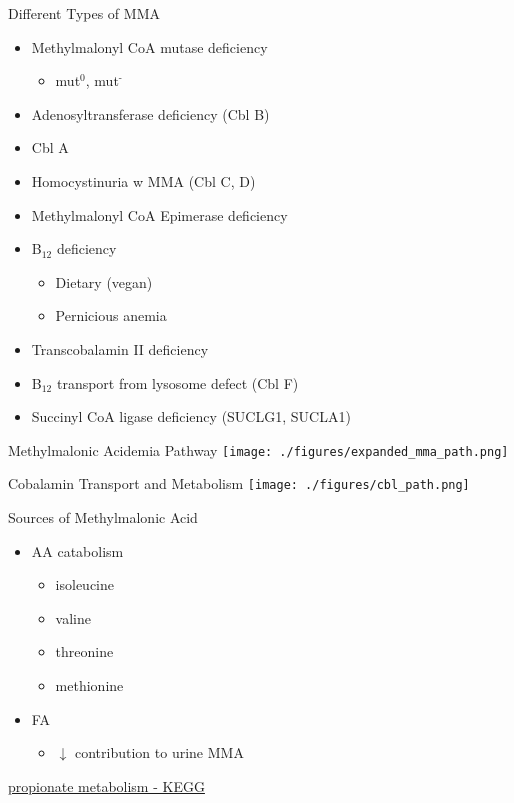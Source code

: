 \documentclass[presentation, smaller]{beamer}
\begin{document}
\begin{frame}[label={sec:orgheadline4}]{Different Types of MMA}
\begin{itemize}
\item Methylmalonyl CoA mutase deficiency
\begin{itemize}
\item mut\(^{\text{0}}\), mut\(^{\text{-}}\)
\end{itemize}
\item Adenosyltransferase deficiency (Cbl B)
\item Cbl A
\item Homocystinuria w MMA (Cbl C, D)
\item Methylmalonyl CoA Epimerase deficiency
\item B\(_{\text{12}}\) deficiency
\begin{itemize}
\item Dietary (vegan)
\item Pernicious anemia
\end{itemize}
\item Transcobalamin II deficiency
\item B\(_{\text{12}}\) transport from lysosome defect (Cbl F)
\item Succinyl CoA ligase deficiency (SUCLG1, SUCLA1)
\end{itemize}
\end{frame}

\begin{frame}[label={sec:orgheadline5}]{Methylmalonic  Acidemia Pathway}
\centering
\texttt{[image: ./figures/expanded\_mma\_path.png]}
\end{frame}

\begin{frame}[label={sec:orgheadline6}]{Cobalamin Transport and Metabolism}
\texttt{[image: ./figures/cbl\_path.png]}
\end{frame}

\begin{frame}[label={sec:orgheadline7}]{Sources of Methylmalonic Acid}
\begin{itemize}
\item AA catabolism
\begin{itemize}
\item isoleucine
\item valine
\item threonine
\item methionine
\end{itemize}
\item FA
\begin{itemize}
\item \(\downarrow\) contribution to urine MMA
\end{itemize}
\end{itemize}

\href{http://www.genome.jp/kegg-bin/show_pathway?org_name=hsa&mapno=00640&mapscale=&show_description=hide}{propionate metabolism - KEGG}
\end{frame}
\end{document}
